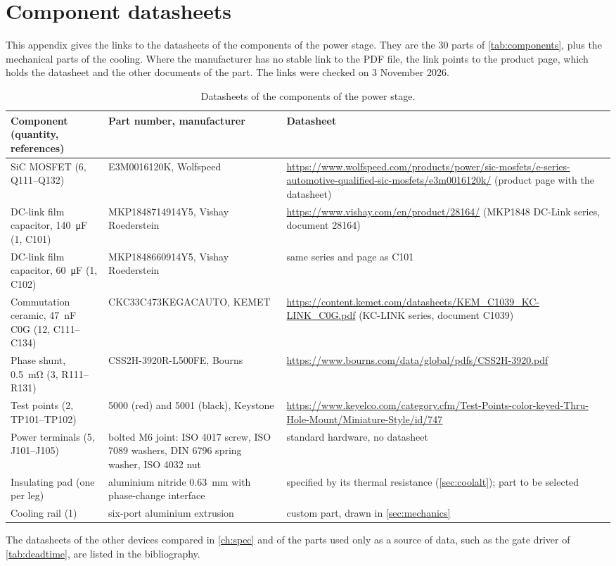 \chapter{Component datasheets}
\label{app:datasheets}

This appendix gives the links to the datasheets of the components of the
power stage. They are the 30 parts of \cref{tab:components}, plus the
mechanical parts of the cooling. Where the manufacturer has no stable link to
the PDF file, the link points to the product page, which holds the datasheet
and the other documents of the part. The links were checked on 3 November
2026.

\begin{table}[H]
\centering
\caption{Datasheets of the components of the power stage.}
\label{tab:datasheets}
\footnotesize
\zebra
\begin{tabularx}{\textwidth}{L{0.22\textwidth}L{0.28\textwidth}Y}
\toprule
Component (quantity, references) & Part number, manufacturer & Datasheet \\
\midrule
SiC MOSFET (6, Q111--Q132) & E3M0016120K, Wolfspeed
  & \url{https://www.wolfspeed.com/products/power/sic-mosfets/e-series-automotive-qualified-sic-mosfets/e3m0016120k/} (product page with the datasheet) \\
DC-link film capacitor, \SI{140}{\micro\farad} (1, C101) & MKP1848714914Y5, Vishay Roederstein
  & \url{https://www.vishay.com/en/product/28164/} (MKP1848 DC-Link series, document 28164) \\
DC-link film capacitor, \SI{60}{\micro\farad} (1, C102) & MKP1848660914Y5, Vishay Roederstein
  & same series and page as C101 \\
Commutation ceramic, \SI{47}{\nano\farad} C0G (12, C111--C134) & CKC33C473KEGACAUTO, KEMET
  & \url{https://content.kemet.com/datasheets/KEM_C1039_KC-LINK_C0G.pdf} (KC-LINK series, document C1039) \\
Phase shunt, \SI{0.5}{\milli\ohm} (3, R111--R131) & CSS2H-3920R-L500FE, Bourns
  & \url{https://www.bourns.com/data/global/pdfs/CSS2H-3920.pdf} \\
Test points (2, TP101--TP102) & 5000 (red) and 5001 (black), Keystone
  & \url{https://www.keyelco.com/category.cfm/Test-Points-color-keyed-Thru-Hole-Mount/Miniature-Style/id/747} \\
Power terminals (5, J101--J105) & bolted M6 joint: ISO 4017 screw, ISO 7089 washers, DIN 6796 spring washer, ISO 4032 nut
  & standard hardware, no datasheet \\
Insulating pad (one per leg) & aluminium nitride \SI{0.63}{\milli\metre} with phase-change interface
  & specified by its thermal resistance (\cref{sec:coolalt}); part to be selected \\
Cooling rail (1) & six-port aluminium extrusion
  & custom part, drawn in \cref{sec:mechanics} \\
\bottomrule
\end{tabularx}
\end{table}

The datasheets of the other devices compared in \cref{ch:spec} and of the
parts used only as a source of data, such as the gate driver of
\cref{tab:deadtime}, are listed in the bibliography.
